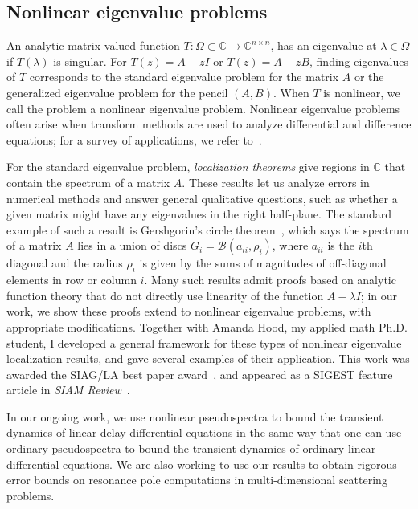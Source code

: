 \documentclass[11pt]{amsart}
\newcommand{\bbC}{\mathbb{C}}
\begin{document}
\subsection*{Nonlinear eigenvalue problems}
An analytic matrix-valued function
$T : \Omega \subset \bbC \rightarrow \bbC^{n \times n}$,
has an eigenvalue at $\lambda \in \Omega$ if $T(\lambda)$ is
singular.  For $T(z) = A-zI$ or $T(z) = A-zB$, finding eigenvalues
of $T$ corresponds to the standard eigenvalue problem for
the matrix $A$ or the generalized eigenvalue problem for the
pencil $(A,B)$.  When $T$ is nonlinear, we call the problem
a nonlinear eigenvalue problem.
Nonlinear eigenvalue problems often arise
when transform methods are used to analyze differential and
difference equations; for a survey of applications,
we refer to~\cite{2015-sirev,Mehrmann:2005:NEP}.

For the standard eigenvalue problem, {\em localization theorems} give
regions in $\bbC$ that contain the spectrum of a matrix $A$.  These
results let us analyze errors in numerical methods and answer general
qualitative questions, such as whether a given matrix might have any
eigenvalues in the right half-plane.  The standard example of such a
result is Gershgorin's circle
theorem~\cite{Varga:2004:GAC,Stewart:1990:MPT}, which says the spectrum
of a matrix $A$ lies in a union of discs $G_i = \mathcal{B}(a_{ii},
\rho_i)$, where $a_{ii}$ is the $i$th diagonal and the radius $\rho_i$
is given by the sums of magnitudes of off-diagonal elements in row or
column $i$.  Many such results admit proofs based on analytic function
theory that do not directly use linearity of the
function $A-\lambda I$; in our work, we show these proofs
extend to nonlinear eigenvalue problems, with appropriate modifications.
Together with Amanda Hood, my applied math Ph.D. student, I developed a
general framework for these types of nonlinear eigenvalue localization
results, and gave several examples of their application.  This work was
awarded the SIAG/LA best paper award~\cite{2013-simax}, and appeared as
a SIGEST feature article in {\em SIAM Review}~\cite{2015-sirev}.

In our ongoing work, we use nonlinear pseudospectra to bound the
transient dynamics of linear delay-differential equations in the same
way that one can use ordinary pseudospectra to bound the transient
dynamics of ordinary linear differential equations.  We are also working
to use our results to obtain rigorous error bounds on resonance pole
computations in multi-dimensional scattering problems.
\end{document}
